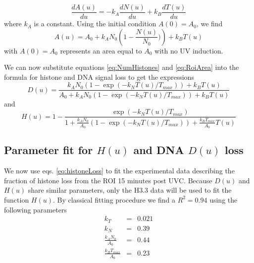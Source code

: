 \documentclass[12pt]{article}
\begin{document}
\begin{equation}\label{dralpha}
\frac{dA(u)}{du}=-k_A\frac{dN(u)}{du}+k_B\frac{dT(u)}{du}
\end{equation}
where $k_A$ is a constant. Using the initial condition $A(0)=A_0$, we find 
\begin{equation}\label{eq:RoiArea}
A(u) = A_0 +k_AN_0\left(1-\frac{N(u)}{N_0})\right) +k_BT(u)
\end{equation}
with $A(0)=A_0$ represents an area equal to $A_0$  with no UV induction. 

We can now substitute equations \ref{eq:NumHistones} and \ref{eq:RoiArea} into the formula for histone and DNA signal loss to get the expressions 
\begin{equation}
\label{eq:DnaLoss}
D(u) = \frac{k_AN_0\left(1-\exp\left(-k_NT(u)/T_{max}\right)\right) +k_BT(u)}{A_0+k_AN_0\left(1-\exp\left(-k_NT(u)/T_{max}\right)\right) +k_BT(u)}
\end{equation}
and 
\begin{equation}\label{eq:histoneLoss}
H(u) = 1- \frac{\exp\left(-k_NT(u)/T_{max}\right)}{1+\frac{k_AN_0}{A_0}\left(1-\exp\left(-k_NT(u)/T_{max}\right)\right) +\frac{k_BT_{max}}{A_0}T(u)}
\end{equation}


\subsection{Parameter fit for $H(u)$ and DNA $D(u)$ loss}\label{subsection:parameterFit}
We now use eqs. \ref{eq:histoneLoss} to fit the experimental data describing the fraction of histone loss from the ROI 15 minutes post UVC. Because $D(u)$ and $H(u)$ share similar parameters, only the H3.3 data will be used to fit the function $H(u)$. 
By classical fitting procedure we find a $R^2= 0.94$ using the following parameters
\begin{eqnarray*}
k_T &=&  0.021\\
k_N &=&  0.39\\
\frac{k_AN_0}{A_0}&=& 0.44\\
\frac{k_BT_{max}}{A_0}&=& 0.23
\end{eqnarray*}
\end{document}
